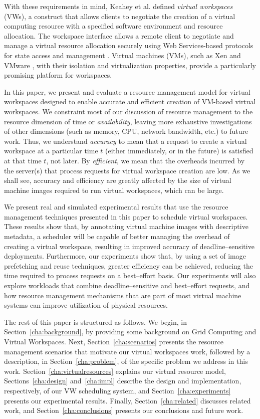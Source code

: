With these requirements in mind, Keahey et al. \cite{VirtualWorkspaces05} defined \emph{virtual workspaces} (VWs), a construct that allows clients to negotiate the creation of a virtual computing resource with a specified software environment and resource allocation. The workspace interface allows a remote client to negotiate and manage a virtual resource allocation securely using Web Services{}-based protocols for state access and management \cite{ModelingState05}. Virtual machines (VMs), such as Xen \cite{xen} and VMware \cite{vmwareweb}, with their isolation and virtualization properties, provide a
particularly promising platform for workspaces.

In this paper, we present and evaluate a resource management model for virtual workspaces designed to enable accurate and efficient creation of VM{}-based virtual workspaces. We constraint most of our discussion of resource management to the resource dimension of time or \emph{availability}, leaving more exhaustive investigations of other dimensions (such as memory, CPU, network bandwidth, etc.) to future work. Thus, we understand \emph{accuracy} to mean that a request to create a virtual workspace at a particular time $t$ (either immediately, or in the future) is satisfied at that time $t$, not later. By \emph{efficient}, we mean that the overheads incurred by the server(s) that process requests for virtual workspace creation are low. As we shall see, accuracy and efficiency are greatly affected by the size of virtual machine images required to run virtual workspaces, which can be large. 

We present real and simulated experimental results that use the resource management techniques presented in this paper to schedule virtual workspaces. These results show that, by annotating virtual machine images with descriptive metadata, a scheduler will be capable of better managing the overhead of creating a virtual workspace, resulting in improved accuracy of deadline--sensitive deployments. Furthermore, our experiments show that, by using a set of image prefetching and reuse techniques, greater efficiency can be achieved, reducing the time required to process requests on a best--effort basis. Our experiments will also explore workloads that combine deadline--sensitive and best--effort requests, and how resource management mechanisms that are part of most virtual machine systems can improve utilization of physical resources.

The rest of this paper is structured as follows. We begin, in Section~\ref{cha:background}, by providing some background on Grid Computing and Virtual Workspaces. Next, Section~\ref{cha:scenarios} presents the resource management scenarios
that motivate our virtual workspaces work, followed by a description, in Section~\ref{cha:problem}, of the specific problem we address in this work. Section~\ref{cha:virtualresources} explains our virtual resource model, Sections~\ref{cha:design}  and~\ref{cha:impl} describe the design and implementation, respectively, of our VW scheduling system, and Section~\ref{cha:experiments} presents our experimental results. Finally, Section~\ref{cha:related} discusses related work, and Section~\ref{cha:conclusions} presents our conclusions and future work.
